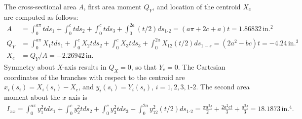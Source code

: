 \documentclass{AeroStructure-ERJohnson}
\begin{document}
\begin{example}
\begin{table}[H]
\vspace*{-12pt}
\vspace*{-1.6\baselineskip}
\end{table}

The cross-sectional area \textit{A}, first area moment ${Q}_Y$, and location of the centroid ${X}_c$ are computed as follows:
\begin{align}
A &=\int_{0}^{a \pi} t d s_{1}+\int_{0}^{c} t d s_{2}+\int_{0}^{c} t d s_{3}+\int_{0}^{2a}(t/2) d s_{\textrm{1-2}}=(a \pi+2 c+a) t=1.86832\,\mathrm{in}.^{2}\label{ex4.12a}\\
Q_{Y} &=\int_{0}^{a \pi} X_{1} t d s_{1}+\int_{0}^{c} X_{2} t d s_{2}+\int_{0}^{c} X_{3} t d s_{3}+\int_{0}^{2a} X_{12}(t/ 2) d s_{1-s}=(2 a^{2}-b c) t=-4.24\,\textrm{in}.^{3}\label{ex4.12b}\\
X_{c} &=Q_{Y}/A=-2.26942\,\textrm{in}.\label{ex4.12c}
\end{align}
Symmetry about \textit{X}-axis results in $Q_{X}=0$, so that $Y_{c}=0$. The Cartesian coordinates of the branches with respect to the centroid are $x_{i}\left(s_{i}\right)=X_{i}\left(s_{i}\right)-X_{c}$, and $y_{i}\left(s_{i}\right)=Y_{i}\left(s_{i}\right)$, $i=1,2,3,1$-$2$. The second area moment about the $x$-axis is
\begin{align}\label{ex4.12d}
I_{x x}=\int_{0}^{a \pi} y_{1}^{2} t d s_{1}+\int_{0}^{c} y_{2}^{2} t d s_{2}+\int_{0}^{c} y_{3}^{2} t d s_{3}+\int_{0}^{2a} y_{12}^{2}(t/2) d s_{\textrm{1-2}}=\frac{\pi a^{3} t}{2}+\frac{2 a^{2} c t}{3}+\frac{a^{3} t}{3}=18.1873\,\textrm{in}.^{4}.
\end{align}


\end{example}
\end{document}
